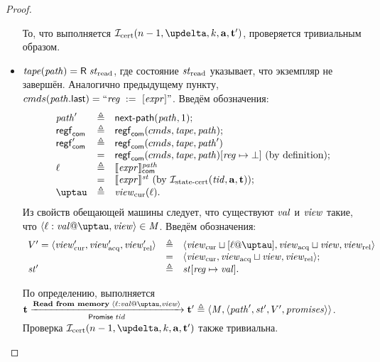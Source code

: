\begin{proof}
\begin{itemize}
      То, что выполняется $\invCert(n - 1, \delta, k, \aT, \tT')$, проверяется тривиальным образом.

    \item $\tape(\cpath) = \tapeRead{\Rstate}$, где состояние $\mathit{st}_{\textup{\rm read}}$ указывает, что экземпляр не завершён.
      Аналогично предыдущему пункту, ${cmds}(\mathit{path}.\textup{\sf last}) = ``\mathit{reg} \;:=_{}\;[\mathit{expr}]"$.
      Введём обозначения:
      \[\begin{array}{l l l}
        \cpath'    & \triangleq & \nextPath{\cpath}{1}; \\
        \regstcom  & \triangleq & \regstcom(\Cprom, \tape, \cpath); \\
        \regstcom' & \triangleq & \regstcom(\Cprom, \tape, \cpath') \\
                   & =          & \regstcom(\Cprom, \tape, \cpath)[\reg \mapsto \bot] \text{ (by definition)}; \\
        \loc       & \triangleq & \semfcom{\expr}{\cpath} \\
                   & =          & \semf{\expr}{\PromState} \text{ (by $\invStateCERT(\tId, \aT, \tT)$)}; \\
        \tau       & \triangleq & \Rcur(\loc). \\
      \end{array}\]
      Из свойств обещающей машины следует, что существуют $\mathit{val}$ и $\mathit{view}$ такие, что
      $\writeEvt{\loc}{\stval}{\tau}{\R} \in \Mprom$.
      Введём обозначения:
      \[\begin{array}{l l l}
      \V' = \angled{\Rcur', \Racq', \Rrel'} & \triangleq & \angled{\Rcur \sqcup [\loc @ \tau], \Racq \sqcup \R, \Rrel} \\
                                            & =          & \angled{\Rcur, \Racq \sqcup \R, \Rrel}; \\
      \PromState' & \triangleq & \PromState[\reg \mapsto \stval].
      \end{array}\]
      
      По определению, выполняется
      $\tT \promTStepReadLoc \tT' \triangleq \angled{\Mprom, \angled{\cpath', \PromState', \V', \PromSet}}$.
      Проверка $\invCert(n - 1, \delta, k, \aT, \tT')$ также тривиальна.


\end{itemize}
\end{proof}
